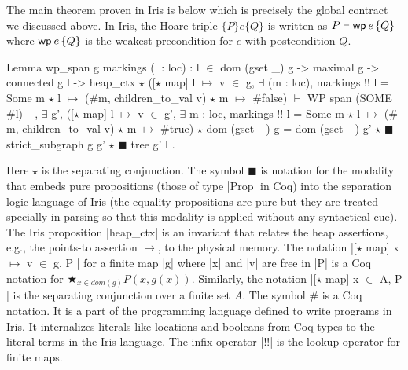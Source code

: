 \documentclass[]{scrartcl}
\begin{document}
The main theorem proven in Iris is  below
which is precisely the global contract we discussed above.
In Iris, the Hoare triple $\{P\}e\{Q\}$ is written as $P \vdash \wpre{e}{Q}$
where $\wpre{e}{Q}$ is the weakest precondition for
$e$ with postcondition $Q$.
\begin{Coq}
Lemma wp_span g markings (l : loc) :
    l $\in$ dom (gset _) g -> maximal g -> connected g l ->
    heap_ctx $\star$
    ([$\star$ map] l $\mapsto$ v $\in$ g,
       $\exists$ (m : loc), markings !! l = Some m $\star$
          l $\mapsto$ ($\#$m, children_to_val v) $\star$ m $\mapsto$ $\#$false) $\vdash$
    WP span (SOME $\#$l)
    {{ _, $\exists$ g',
            ([$\star$ map] l $\mapsto$ v $\in$ g',
              $\exists$ m : loc, markings !! l = Some m $\star$
                l $\mapsto$ ($\#$m, children_to_val v) $\star$ m $\mapsto$ $\#$true)
           $\star$ dom (gset _) g = dom (gset _) g'
           $\star$ $\scriptscriptstyle\blacksquare$ strict_subgraph g g' $\star$ $\scriptscriptstyle\blacksquare$ tree g' l }}.
\end{Coq}
Here $\star$ is the separating conjunction. The symbol $\scriptscriptstyle\blacksquare$ is notation for the modality that
embeds pure propositions (those of type \Coqe|Prop| in Coq) into
the separation logic language of Iris (the equality propositions are pure but they are treated specially in parsing so that this modality is applied without any syntactical cue).
The Iris proposition \Coqe|heap_ctx| is an invariant that relates the heap
assertions, e.g., the points-to assertion $\mapsto$, to the physical memory.
The notation \Coqe|[$\star$ map] x $
\mapsto$ v $\in$ g, P | for a finite map \Coqe|g| where \Coqe|x| and \Coqe|v| are free in \Coqe|P| is a Coq notation for $
\bigstar_{x \in dom(g)} P(x, g(x))$.
Similarly, the notation \Coqe|[$\star$ map] x $\in$ A, P | is the separating
conjunction over a finite set $A$.
The symbol $\#$ is a Coq notation. It is a part of the programming
language defined to write programs in Iris.
It internalizes literals like locations and booleans from Coq types to the literal terms in the Iris language.
The infix operator \Coqe|!!| is the lookup operator for finite maps.
\end{document}
